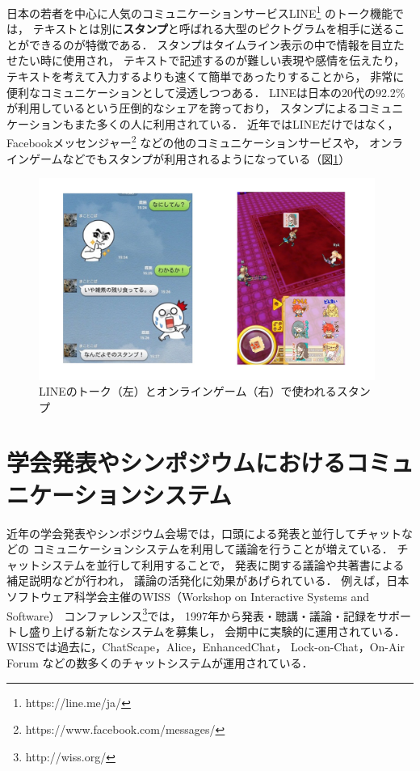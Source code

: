 日本の若者を中心に人気のコミュニケーションサービスLINE\footnote{\textsf{https://line.me/ja/}}
のトーク機能では，
テキストとは別に{\bf スタンプ}と呼ばれる大型のピクトグラムを相手に送ることができるのが特徴である．
スタンプはタイムライン表示の中で情報を目立たせたい時に使用され，
テキストで記述するのが難しい表現や感情を伝えたり，
テキストを考えて入力するよりも速くて簡単であったりすることから，
非常に便利なコミュニケーションとして浸透しつつある．
LINEは日本の20代の92.2\%が利用しているという圧倒的なシェアを誇っており\cite{soumu27}，
スタンプによるコミュニケーションもまた多くの人に利用されている\cite{40020496489}．
近年ではLINEだけではなく，Facebookメッセンジャー\footnote{\textsf{https://www.facebook.com/messages/}}
などの他のコミュニケーションサービスや，
オンラインゲームなどでもスタンプが利用されるようになっている（図\ref{gamestamp}）

\begin{figure}[H]
\centering
\includegraphics[width=11cm]{images/gamestamp.png}
\caption{LINEのトーク（左）とオンラインゲーム（右）で使われるスタンプ}
\label{gamestamp}
\end{figure}


\section{学会発表やシンポジウムにおけるコミュニケーションシステム}
\label{chap:background_2}

近年の学会発表やシンポジウム会場では，口頭による発表と並行してチャットなどの
コミュニケーションシステムを利用して議論を行うことが増えている\cite{goto2012}．
チャットシステムを並行して利用することで，
発表に関する議論や共著書による補足説明などが行われ，
議論の活発化に効果があげられている\cite{40000002634}．
例えば，日本ソフトウェア科学会主催のWISS（Workshop on Interactive Systems and Software）
コンファレンス\footnote{\textsf{http://wiss.org/}}では，
1997年から発表・聴講・議論・記録をサポートし盛り上げる新たなシステムを募集し，
会期中に実験的に運用されている\cite{wiss_challenge}．
WISSでは過去に，ChatScape\cite{308}，Alice\cite{fukui}，EnhancedChat\cite{110002711453}，
Lock-on-Chat\cite{nishida2006}，On-Air Forum\cite{nishida2011}
などの数多くのチャットシステムが運用されている．


